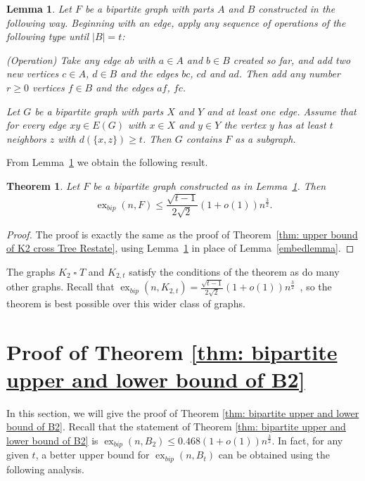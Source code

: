 \documentclass[11pt,a4paper]{article}
\newtheorem{theorem}{Theorem}[section]
\newtheorem{lemma}{Lemma}[section]
\theoremstyle{definition}
\DeclareMathOperator{\ex}{ex}
\begin{document}
\begin{lemma} \label{generallemma}
Let $F$ be a bipartite graph with parts $A$ and $B$ constructed in the following way.  Beginning with an edge, apply any sequence of operations of the following type until $|B|=t$: 

\smallskip
(Operation) Take any edge $ab$ with $a\in A$ and $b\in B$ created so far, and add two new vertices $c \in A$, $d \in B$ and the edges $bc$, $cd$ and $ad$.  Then add any number $r\ge 0$  vertices $f \in B$ and the edges $af$, $fc$.  
\smallskip

Let $G$ be a bipartite graph with parts $X$ and $Y$ and at least one edge. Assume that for every edge $xy \in E(G)$ with $x\in X$ and $y\in Y$ the vertex $y$ has at least $t$ neighbors $z$ with $d(\{x,z\}) \ge t$. Then $G$ contains $F$ as a subgraph.
\end{lemma}

From Lemma~\ref{generallemma} we obtain the following result.

\begin{theorem}\label{generalversion}
Let $F$ be a bipartite graph constructed as in Lemma~\ref{generallemma}. Then 
\[
\ex_{bip}(n,F)\leq \frac{\sqrt{t-1}}{2\sqrt{2}}(1+o(1)) n^{\frac{3}{2}}.
\]
\end{theorem}
\begin{proof}
    The proof is exactly the same as the proof of Theorem~\ref{thm: upper bound of K2 cross Tree Restate}, using Lemma~\ref{generallemma} in place of Lemma~\ref{embedlemma}.
\end{proof}

The graphs $K_2 \mathbin{\square} T$ and $K_{2,t}$ satisfy the conditions of the theorem as do many other graphs.  Recall that $\ex_{bip}(n,K_{2,t}) = \frac{\sqrt{t-1}}{2\sqrt{2}}(1+o(1)) n^{\frac{3}{2}}$~\cite{kst,mors1981new}, so the theorem is best possible over this wider class of graphs.

    \section{Proof of Theorem \ref{thm: bipartite upper and lower bound of B2}}\label{sec: Bt bipartite}

        In this section, we will give the proof of Theorem \ref{thm: bipartite upper and lower bound of B2}.
        Recall that the statement of Theorem \ref{thm: bipartite upper and lower bound of B2} is $\ex_{bip} (n, B_2) \leq 0.468 (1+o(1)) n^{\frac{3}{2}}$.
        In fact, for any given $t$, a better upper bound for $\ex_{bip} (n, B_t)$ can be obtained using the following analysis.
\end{document}

